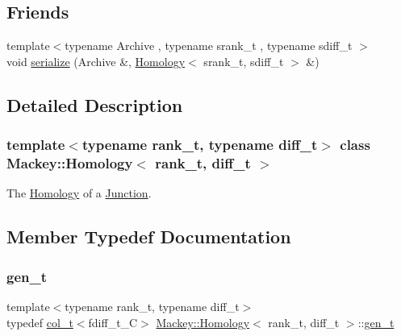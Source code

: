 \subsection*{Friends}
\begin{DoxyCompactItemize}
\item 
{\footnotesize template$<$typename Archive , typename srank\+\_\+t , typename sdiff\+\_\+t $>$ }\\void \hyperlink{classMackey_1_1Homology_afe2aae7d5b96af426bfe7a7898459cb6}{serialize} (Archive \&, \hyperlink{classMackey_1_1Homology}{Homology}$<$ srank\+\_\+t, sdiff\+\_\+t $>$ \&)
\end{DoxyCompactItemize}


\subsection{Detailed Description}
\subsubsection*{template$<$typename rank\+\_\+t, typename diff\+\_\+t$>$\newline
class Mackey\+::\+Homology$<$ rank\+\_\+t, diff\+\_\+t $>$}

The \hyperlink{classMackey_1_1Homology}{Homology} of a \hyperlink{classMackey_1_1Junction}{Junction}. 

\subsection{Member Typedef Documentation}
\mbox{\label{classMackey_1_1Homology_a0f7541ee6181c75cb7efa41f3b63f0a5}} 
\subsubsection{\texorpdfstring{gen\+\_\+t}{gen\_t}}
{\footnotesize\ttfamily template$<$typename rank\+\_\+t, typename diff\+\_\+t$>$ \\
typedef \hyperlink{namespaceMackey_a3374980e3b5001f5ba9b206004180627}{col\+\_\+t}$<$fdiff\+\_\+t\+\_\+C$>$ \hyperlink{classMackey_1_1Homology}{Mackey\+::\+Homology}$<$ rank\+\_\+t, diff\+\_\+t $>$\+::\hyperlink{classMackey_1_1Homology_a0f7541ee6181c75cb7efa41f3b63f0a5}{gen\+\_\+t}}



